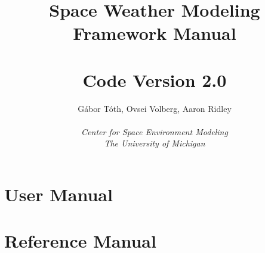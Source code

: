 \documentclass[twoside,10pt]{book}
\title{Space Weather Modeling Framework Manual \\ 
       \hfill \\
       \large Code Version 2.0}
\author{G\'abor T\'oth, Ovsei Volberg, Aaron Ridley\\
       \hfill \\
       {\it Center for Space Environment Modeling}\\
       {\it The University of Michigan}}
\begin{document}
\pagestyle{fancy}
\lhead[\fancyplain{}{\bfseries\thepage}]{\fancyplain{}{\bfseries\rightmark}}
\rhead[\fancyplain{}{\bfseries\leftmark}]{\fancyplain{}{\bfseries\thepage}}
\cfoot{}

\maketitle

\tableofcontents



\chapter{User Manual}








\chapter{Reference Manual}




\end{document}
